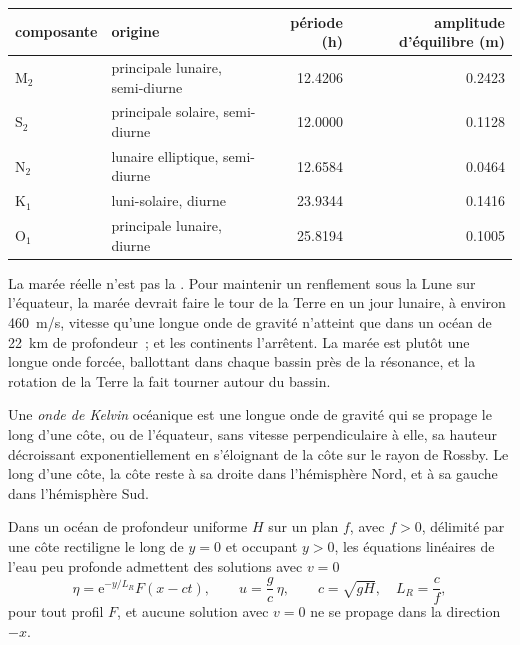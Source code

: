 \begin{center}
\small
\begin{tabular}{llrr}
\hline
composante & origine & période (\unit{h}) & amplitude d'équilibre (\unit{m}) \\
\hline
M$_2$ & principale lunaire, semi-diurne & \num{12.4206} & \num{0.2423} \\
S$_2$ & principale solaire, semi-diurne & \num{12.0000} & \num{0.1128} \\
N$_2$ & lunaire elliptique, semi-diurne & \num{12.6584} & \num{0.0464} \\
K$_1$ & luni-solaire, diurne & \num{23.9344} & \num{0.1416} \\
O$_1$ & principale lunaire, diurne & \num{25.8194} & \num{0.1005} \\
\hline
\end{tabular}
\end{center}

La marée réelle n'est pas la . Pour maintenir un renflement sous la Lune
sur l'équateur, la marée devrait faire le tour de la Terre en un jour lunaire,
à environ \qty{460}{m/s}, vitesse qu'une longue onde de gravité n'atteint que
dans un océan de \qty{22}{km} de profondeur~; et les continents l'arrêtent. La marée est
plutôt une longue onde forcée, ballottant dans chaque bassin près de la résonance, et la
rotation de la Terre la fait tourner autour du bassin.

\begin{definition}\label{def:b3:ocean-dynamics:kelvin-wave}
Une \emph{onde de Kelvin} océanique est une longue onde de gravité
qui se propage le long d'une côte, ou de l'équateur, sans vitesse
perpendiculaire à elle, sa hauteur décroissant exponentiellement en s'éloignant de la côte sur le
rayon de Rossby. Le long d'une côte, la côte reste à sa droite dans
l'hémisphère Nord, et à sa gauche dans l'hémisphère Sud.
\end{definition}

\begin{theorem}\label{thm:b3:ocean-dynamics:kelvin}
Dans un océan de profondeur uniforme $H$ sur un plan $f$, avec $f > 0$, délimité par
une côte rectiligne le long de $y = 0$ et occupant $y > 0$, les équations linéaires de l'eau peu profonde
admettent des solutions avec $v = 0$
\[
\eta = \mathrm e^{-y/L_R}F(x - ct),\qquad u = \frac{g}{c}\,\eta,\qquad
c = \sqrt{gH},\quad L_R = \frac{c}{f},
\]
pour tout profil $F$, et aucune solution avec $v = 0$ ne se propage dans la direction
$-x$.
\end{theorem}

